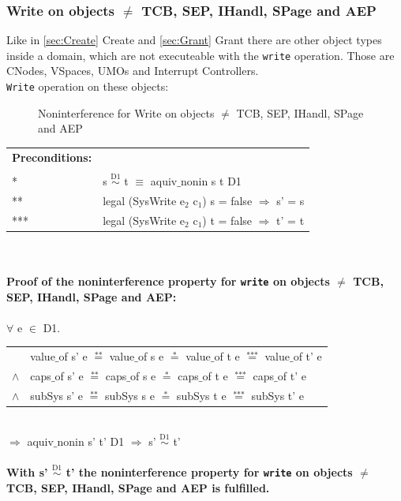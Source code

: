 \documentclass[11pt,a4paper,twoside]{article}
\begin{document}
{\subsubsection{Write on objects $\neq$ TCB, SEP, IHandl, SPage and AEP}\label{WriteOthers}
Like in \ref{sec:Create} Create and \ref{sec:Grant} Grant there are other object types inside a domain, which are not executeable with the \texttt{write} operation. Those are CNodes, VSpaces, UMOs and Interrupt Controllers. \\
\texttt{Write} operation on these objects: \\
\begin{flushleft}
\begin{figure}[H]
\caption{Noninterference for Write on objects $\neq$ TCB, SEP, IHandl, SPage and AEP}
\end{figure}
\end{flushleft}
\begin{tabular}{ll}
\textbf{Preconditions:} \\ \\
* & s $\overset{\text{D1}}{\sim}$ t $\equiv$ aquiv$\_$nonin s t D1	\\ 
** & legal (SysWrite e$_2$ c$_1$) s = false $\Rightarrow$ s' = s \\ 
*** & legal (SysWrite e$_2$ c$_1$) t = false $\Rightarrow$ t' = t
\end{tabular} \\ \\ 
\textbf{Proof of the noninterference property for \texttt{write} on objects $\neq$ TCB, SEP, IHandl, SPage and AEP:}\\ \\
$\forall$ e $\in$ D1. \\ 
\begin{tabular}{ll}
& value$\_$of s' e $\overset{\text{**}}{=}$ value$\_$of s e $\overset{\text{*}}{=}$ value$\_$of t e $\overset{\text{***}}{=}$ value$\_$of t' e \\
$\wedge$ & caps$\_$of s' e $\overset{\text{**}}{=}$ caps$\_$of s e $\overset{\text{*}}{=}$ caps$\_$of t e $\overset{\text{***}}{=}$ caps$\_$of t' e \\
$\wedge$ & subSys s' e $\overset{\text{**}}{=}$ subSys s e $\overset{\text{*}}{=}$ subSys t e $\overset{\text{***}}{=}$ subSys t' e
\end{tabular} \\
$\Rightarrow$ aquiv$\_$nonin s' t' D1 $\Rightarrow$ s' $\overset{\text{D1}}{\sim}$ t' \\ \\
\textbf{With s' $\overset{\text{D1}}{\sim}$ t' the noninterference property for \texttt{write} on objects $\neq$ TCB, SEP, IHandl, SPage and AEP is fulfilled.} 
\clearpage
}
\end{document}
